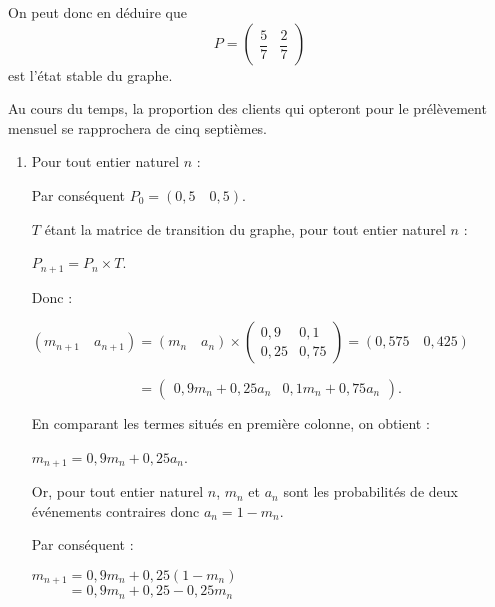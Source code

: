 \begin{corrige}
\begin{enumerate}
\par
On peut donc en déduire que
\[ P=\begin{pmatrix} \dfrac{5}{7} & \dfrac{2}{7} \end{pmatrix} \]
est l'état stable du graphe.
\par
Au cours du temps, la proportion des clients qui opteront pour le prélèvement mensuel se rapprochera de cinq septièmes.
\end{enumerate}
\par
%
%
\par
\begin{enumerate}
     \item %
     Pour tout entier naturel $n$ :
     \par
     Par conséquent $P_0=(0,5 \quad 0,5)$.
     \par
     $T$ étant la matrice de transition du graphe, pour tout entier naturel $n$ :
     \par
     $P_{n+1} = P_n \times T$.
     \par
     Donc :
     \par
     $(m_{n+1} \quad a_{n+1}) = (m_n \quad a_n) \times \begin{pmatrix}
          0,9 & 0,1\\
          0,25 & 0,75
     \end{pmatrix} = (0,575 \quad 0,425)$
     \par
     $\phantom{(m_{n+1} \quad a_{n+1})} = \begin{pmatrix} 0,9m_n+0,25a_n & 0,1m_n+0,75a_n\end{pmatrix} $.
     \par
     En comparant les termes situés en première colonne, on obtient :
     \par
     $m_{n+1} = 0,9m_n+0,25a_n$.
     \par
     Or, pour tout entier naturel $n$, $m_n$ et $a_n$ sont les probabilités de deux événements contraires donc ${a_n=1-m_n}$.
     \par
     Par conséquent :
     \par
     \par
     $m_{n+1}  = 0,9m_n+0,25(1-m_n)$\\
     $\phantom{m_{n+1}	}	 = 0,9m_n+0,25-0,25m_n$\\

\end{enumerate}
\end{corrige}
